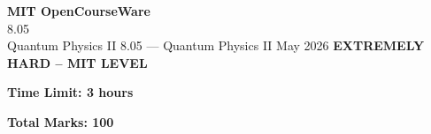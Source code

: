 \documentclass[12pt,a4paper]{exam}
\begin{document}
\begin{center}
{\LARGE \textbf{MIT OpenCourseWare}}\\8.05\\Quantum Physics II
\vspace{0.5cm}
{8.05} --- {Quantum Physics II}
\vspace{0.3cm}
May 2026
\vspace{0.3cm}
\textbf{EXTREMELY HARD -- MIT LEVEL}
\end{center}

\begin{center}
\textbf{Time Limit: 3 hours}
\end{center}

\begin{center}
\textbf{Total Marks: 100}
\end{center}

\vspace{0.5cm}
\end{document}
